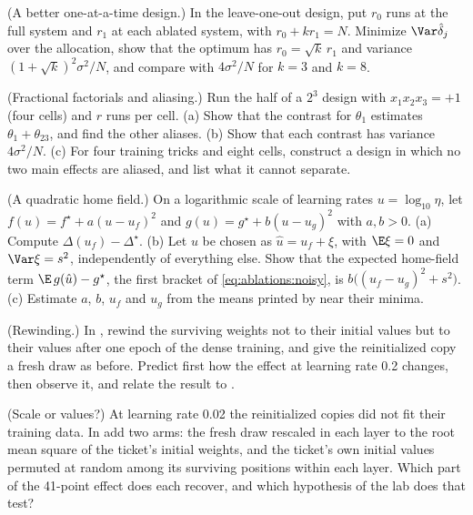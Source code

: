 \begin{refsection}
\begin{exercises}
\item \consolidation (A better one-at-a-time design.) In the leave-one-out design, put $r_0$ runs at the full system and $r_1$ at each ablated system, with $r_0+kr_1=N$. Minimize $\Var\hat\delta_j$ over the allocation, show that the optimum has $r_0=\sqrt k\,r_1$ and variance $(1+\sqrt k)^2\sigma^2/N$, and compare with $4\sigma^2/N$ for $k=3$ and $k=8$. \label{ex:ablations:allocation}

\item \consolidation\hard (Fractional factorials and aliasing.) Run the half of a $2^3$ design with $x_1x_2x_3=+1$ (four cells) and $r$ runs per cell. (a) Show that the contrast for $\theta_1$ estimates $\theta_1+\theta_{23}$, and find the other aliases. (b) Show that each contrast has variance $4\sigma^2/N$. (c) For four training tricks and eight cells, construct a design in which no two main effects are aliased, and list what it cannot separate. \label{ex:ablations:fractional}

\item \consolidation (A quadratic home field.) On a logarithmic scale of learning rates $u=\log_{10}\eta$, let $f(u)=f^\star+a(u-u_f)^2$ and $g(u)=g^\star+b(u-u_g)^2$ with $a,b>0$. (a) Compute $\Delta(u_f)-\Delta^\star$. (b) Let $u$ be chosen as $\hat u=u_f+\xi$, with $\E\xi=0$ and $\Var\xi=s^2$, independently of everything else. Show that the expected home-field term $\E\,g(\hat u)-g^\star$, the first bracket of \eqref{eq:ablations:noisy}, is $b\bigl((u_f-u_g)^2+s^2\bigr)$. (c) Estimate $a$, $b$, $u_f$ and $u_g$ from the means printed by  near their minima.\label{ex:ablations:quadratic}

\item \labwork (Rewinding.) In , rewind the surviving weights not to their initial values but to their values after one epoch of the dense training, and give the reinitialized copy a fresh draw as before. Predict first how the effect at learning rate 0.2 changes, then observe it, and relate the result to \textcite{FrankleEtAl2020}.\label{ex:ablations:rewind}

\item \labwork (Scale or values?) At learning rate 0.02 the reinitialized copies did not fit their training data. In  add two arms: the fresh draw rescaled in each layer to the root mean square of the ticket's initial weights, and the ticket's own initial values permuted at random among its surviving positions within each layer. Which part of the 41-point effect does each recover, and which hypothesis of the lab does that test?\label{ex:ablations:scale}


\end{exercises}
\end{refsection}
